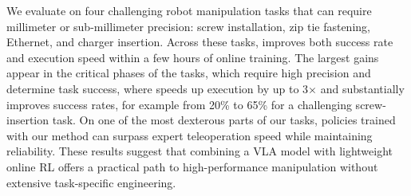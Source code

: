 We evaluate \MethodName{} on four challenging robot manipulation tasks that can require millimeter or sub-millimeter precision: screw installation, zip tie fastening, Ethernet, and charger insertion.
Across these tasks, \MethodName{} improves both success rate and execution speed within a few hours of online training. The largest gains appear in the critical phases of the tasks, which require high precision and determine task success, where \MethodName{} speeds up execution by up to 3$\times$ and substantially improves success rates, for example from 20\% to 65\% for a challenging screw-insertion task. On one of the most dexterous parts of our tasks, policies trained with our method can surpass expert teleoperation speed while maintaining reliability. These results suggest that combining a VLA model with lightweight online RL offers a practical path to high-performance manipulation without extensive task-specific engineering.
